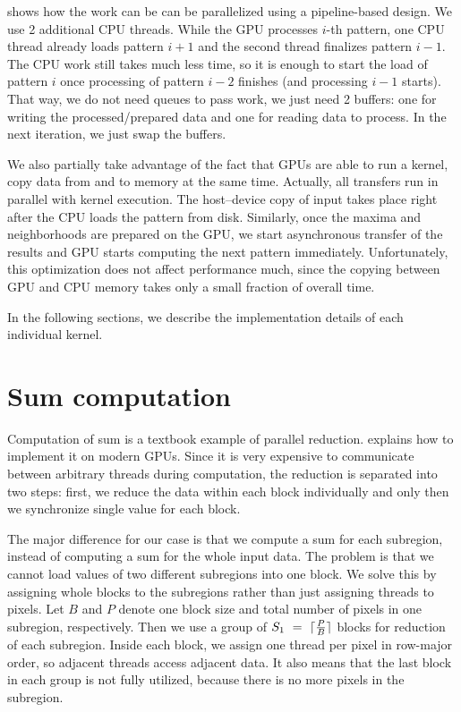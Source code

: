  shows how the work can be can be parallelized using a pipeline-based design. We use 2 additional CPU threads. While the GPU processes $i$-th pattern, one CPU thread already loads pattern $i+1$ and the second thread finalizes pattern $i-1$. The CPU work still takes much less time, so it is enough to start the load of pattern $i$ once processing of pattern $i-2$ finishes (and processing $i-1$ starts). That way, we do not need queues to pass work, we just need 2 buffers: one for writing the processed/prepared data and one for reading data to process. In the next iteration, we just swap the buffers.

We also partially take advantage of the fact that GPUs are able to run a kernel, copy data from and to memory at the same time. Actually, all transfers run in parallel with kernel execution. The host--device copy of input takes place right after the CPU loads the pattern from disk. Similarly, once the maxima and neighborhoods are prepared on the GPU, we start asynchronous transfer of the results and GPU starts computing the next pattern immediately. Unfortunately, this optimization does not affect performance much, since the copying between GPU and CPU memory takes only a small fraction of overall time.

In the following sections, we describe the implementation details of each individual kernel.




\section{Sum computation}

Computation of sum is a textbook example of parallel reduction. \cite{parallelReduction} explains how to implement it on modern GPUs. Since it is very expensive to communicate between arbitrary threads during computation, the reduction is separated into two steps: first, we reduce the data within each block individually and only then we synchronize single value for each block.

The major difference for our case is that we compute a sum for each subregion, instead of computing a sum for the whole input data. The problem is that we cannot load values of two different subregions into one block. We solve this by assigning whole blocks to the subregions rather than just assigning threads to pixels. Let $B$ and $P$ denote one block size and total number of pixels in one subregion, respectively. Then we use a group of $S_1~=~\lceil\frac{P}{B}\rceil$ blocks for reduction of each subregion. Inside each block, we assign one thread per pixel in row-major order, so adjacent threads access adjacent data. It also means that the last block in each group is not fully utilized, because there is no more pixels in the subregion.

